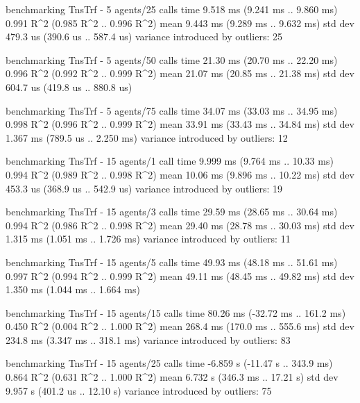\begin{showCode}
    benchmarking TnsTrf - 5 agents/25 calls
    time                 9.518 ms   (9.241 ms .. 9.860 ms)
                         0.991 R^2   (0.985 R^2 .. 0.996 R^2)
    mean                 9.443 ms   (9.289 ms .. 9.632 ms)
    std dev              479.3 us   (390.6 us .. 587.4 us)
    variance introduced by outliers: 25%

    benchmarking TnsTrf - 5 agents/50 calls
    time                 21.30 ms   (20.70 ms .. 22.20 ms)
                         0.996 R^2   (0.992 R^2 .. 0.999 R^2)
    mean                 21.07 ms   (20.85 ms .. 21.38 ms)
    std dev              604.7 us   (419.8 us .. 880.8 us)

    benchmarking TnsTrf - 5 agents/75 calls
    time                 34.07 ms   (33.03 ms .. 34.95 ms)
                         0.998 R^2   (0.996 R^2 .. 0.999 R^2)
    mean                 33.91 ms   (33.43 ms .. 34.84 ms)
    std dev              1.367 ms   (789.5 us .. 2.250 ms)
    variance introduced by outliers: 12%

    benchmarking TnsTrf - 15 agents/1 call
    time                 9.999 ms   (9.764 ms .. 10.33 ms)
                         0.994 R^2   (0.989 R^2 .. 0.998 R^2)
    mean                 10.06 ms   (9.896 ms .. 10.22 ms)
    std dev              453.3 us   (368.9 us .. 542.9 us)
    variance introduced by outliers: 19%

    benchmarking TnsTrf - 15 agents/3 calls
    time                 29.59 ms   (28.65 ms .. 30.64 ms)
                         0.994 R^2   (0.986 R^2 .. 0.998 R^2)
    mean                 29.40 ms   (28.78 ms .. 30.03 ms)
    std dev              1.315 ms   (1.051 ms .. 1.726 ms)
    variance introduced by outliers: 11%

    benchmarking TnsTrf - 15 agents/5 calls
    time                 49.93 ms   (48.18 ms .. 51.61 ms)
                         0.997 R^2   (0.994 R^2 .. 0.999 R^2)
    mean                 49.11 ms   (48.45 ms .. 49.82 ms)
    std dev              1.350 ms   (1.044 ms .. 1.664 ms)

    benchmarking TnsTrf - 15 agents/15 calls
    time                 80.26 ms   (-32.72 ms .. 161.2 ms)
                         0.450 R^2   (0.004 R^2 .. 1.000 R^2)
    mean                 268.4 ms   (170.0 ms .. 555.6 ms)
    std dev              234.8 ms   (3.347 ms .. 318.1 ms)
    variance introduced by outliers: 83%

    benchmarking TnsTrf - 15 agents/25 calls
    time                 -6.859 s   (-11.47 s .. 343.9 ms)
                         0.864 R^2   (0.631 R^2 .. 1.000 R^2)
    mean                 6.732 s    (346.3 ms .. 17.21 s)
    std dev              9.957 s    (401.2 us .. 12.10 s)
    variance introduced by outliers: 75%


\end{showCode}
